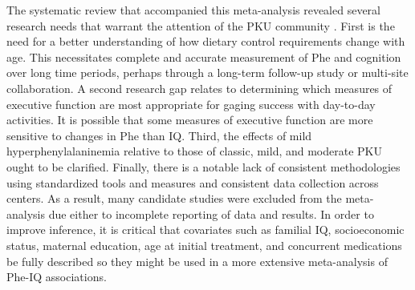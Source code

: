 \documentclass{svjour3}                     %
\begin{document}
The systematic review that accompanied this meta-analysis revealed several research needs that warrant the attention of the PKU community \citep{Lindegren:uj}. First is the need for a better understanding of how dietary control requirements change with age. This necessitates complete and accurate measurement of Phe and cognition over long time periods, perhaps through a long-term follow-up study or multi-site collaboration. A second research gap relates to determining which measures of executive function are most appropriate for gaging success with day-to-day activities. It is possible that some measures of executive function are more sensitive to changes in Phe than IQ. Third, the effects of mild hyperphenylalaninemia relative to those of classic, mild, and moderate PKU ought to be clarified. Finally, there is a notable lack of consistent methodologies using standardized tools and measures and consistent data collection across centers. As a result, many candidate studies were excluded from the meta-analysis due either to incomplete reporting of data and results. In order to improve inference, it is critical that covariates such as familial IQ, socioeconomic status, maternal education, age at initial treatment, and concurrent medications be fully described so they might be used in a more extensive meta-analysis of Phe-IQ associations.




%
%
%
%
%
\clearpage
\end{document}
